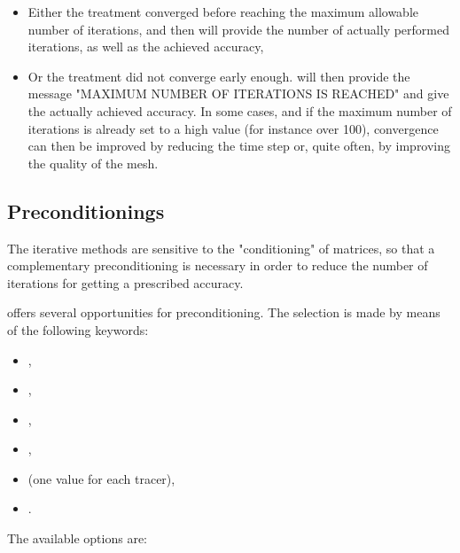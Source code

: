 \begin{itemize}
\item Either the treatment converged before reaching the maximum allowable
number of iterations, and then  will provide the number of actually
performed iterations, as well as the achieved accuracy,

\item Or the treatment did not converge early enough.  will then
provide the message "MAXIMUM NUMBER OF ITERATIONS IS REACHED" and give the
actually achieved accuracy. In some cases, and if the maximum number of
iterations is already set to a high value (for instance over 100), convergence
can then be improved by reducing the time step or, quite often, by improving
the quality of the mesh.
\end{itemize}


\subsection{Preconditionings}
\label{sec:precond}
The iterative methods are sensitive to the "conditioning" of matrices, so that
a complementary preconditioning is necessary in order to reduce the number of
iterations for getting a prescribed accuracy.

 offers several opportunities for preconditioning. The selection is
made by means of the following keywords:

\begin{itemize}
\item {},

\item {},

\item {},

\item {},

\item {} (one value for each
tracer),

\item {}.
\end{itemize}

The available options are:

